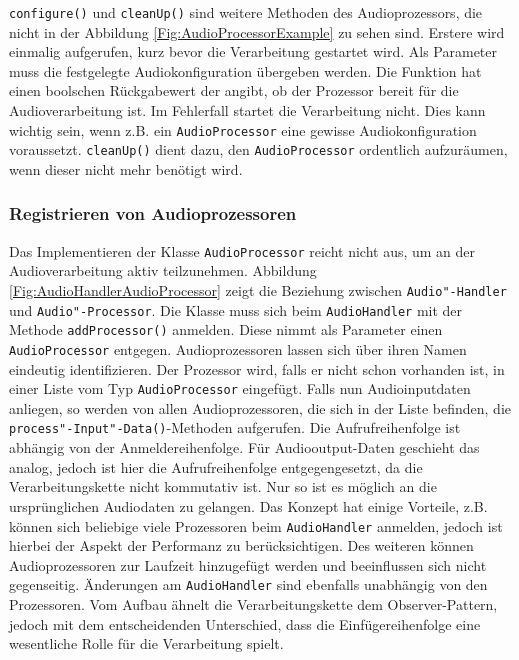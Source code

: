 \texttt{configure()} und \texttt{cleanUp()} sind weitere Methoden des Audioprozessors, die nicht in der Abbildung \ref{Fig:AudioProcessorExample} zu sehen sind. Erstere wird einmalig aufgerufen, kurz bevor die Verarbeitung gestartet wird. Als Parameter muss die festgelegte Audiokonfiguration übergeben werden. Die Funktion hat einen boolschen Rückgabewert der angibt, ob der Prozessor bereit für die Audioverarbeitung ist. Im Fehlerfall startet die Verarbeitung nicht. Dies kann wichtig sein, wenn z.B. ein \texttt{AudioProcessor} eine gewisse Audiokonfiguration voraussetzt. \texttt{cleanUp()} dient dazu, den \texttt{AudioProcessor} ordentlich aufzuräumen, wenn dieser nicht mehr benötigt wird.

\FloatBarrier
\subsubsection{Registrieren von Audioprozessoren}
Das Implementieren der Klasse \texttt{AudioProcessor} reicht nicht aus, um an der Audioverarbeitung aktiv teilzunehmen. Abbildung \ref{Fig:AudioHandlerAudioProcessor} zeigt die Beziehung zwischen \texttt{Audio"-Handler} und \texttt{Audio"-Processor}. Die Klasse muss sich beim \texttt{AudioHandler} mit der Methode \texttt{addProcessor()} anmelden. Diese nimmt als Parameter einen \texttt{AudioProcessor} entgegen. Audioprozessoren lassen sich über ihren Namen eindeutig identifizieren. Der Prozessor wird, falls er nicht schon vorhanden ist, in einer Liste vom Typ \texttt{AudioProcessor} eingefügt. Falls nun Audioinputdaten anliegen, so werden von allen Audioprozessoren, die sich in der Liste befinden, die \texttt{process"-Input"-Data()}-Methoden aufgerufen. Die Aufrufreihenfolge ist abhängig von der Anmeldereihenfolge. Für Audiooutput-Daten geschieht das analog, jedoch ist hier die Aufrufreihenfolge entgegengesetzt, da die Verarbeitungskette nicht kommutativ ist. Nur so ist es möglich an die ursprünglichen Audiodaten zu gelangen. Das Konzept hat einige Vorteile, z.B. können sich beliebige viele Prozessoren beim \texttt{AudioHandler} anmelden, jedoch ist hierbei der Aspekt der Performanz zu berücksichtigen. Des weiteren können Audioprozessoren zur Laufzeit hinzugefügt werden und beeinflussen sich nicht gegenseitig. Änderungen am \texttt{AudioHandler} sind ebenfalls unabhängig von den Prozessoren.
Vom Aufbau ähnelt die Verarbeitungskette dem Observer-Pattern, jedoch mit dem entscheidenden Unterschied, dass die Einfügereihenfolge eine wesentliche Rolle für die Verarbeitung spielt. 
\newline
